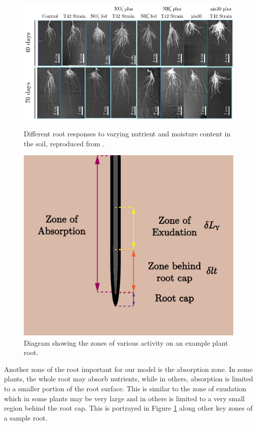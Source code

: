 \documentclass[11pt]{article}
\numberwithin{equation}{section}
\begin{document}
\begin{figure}
\centering
\begin{minipage}{.45\textwidth}
    \centering
    \includegraphics[width=\linewidth]{Figures/rootMorphology.pdf}
    \caption{ Different root responses to varying nutrient and moisture content in the soil, reproduced from \cite{PURNOBASUKI20182012}.}
    \label{fig:roots}
\end{minipage}%
\hfill
\begin{minipage}{.45\textwidth}
  \centering
    \includegraphics[width=.6\textwidth]{Figures/ZonesDiagram-plot.pdf}
    \caption{Diagram showing the zones of various activity on an example plant root.}
    \label{fig:zones}
\end{minipage}
\end{figure}


Another zone of the root important for our model is the absorption zone. In some plants, the whole root may absorb nutrients, while in others, absorption is limited to a smaller portion of the root surface. This is similar to the zone of exudation which in some plants may be very large and in others is limited to a very small region behind the root cap. This is portrayed in Figure \ref{fig:zones} along other key zones of a sample root.
\end{document}
